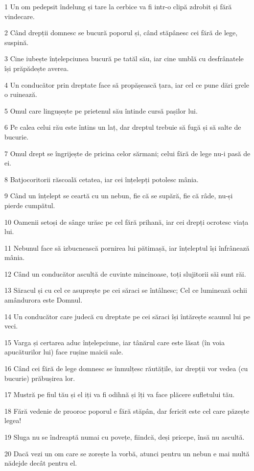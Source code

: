 \par 1 Un om pedepsit îndelung și tare la cerbice va fi intr-o clipă zdrobit și fără vindecare.
\par 2 Când drepții domnesc se bucură poporul și, când stăpânesc cei fără de lege, suspină.
\par 3 Cine iubește înțelepciunea bucură pe tatăl său, iar cine umblă cu desfrânatele își prăpădește averea.
\par 4 Un conducător prin dreptate face să propășească țara, iar cel ce pune dări grele o ruinează.
\par 5 Omul care lingușește pe prietenul său întinde cursă pașilor lui.
\par 6 Pe calea celui rău este întins un laț, dar dreptul trebuie să fugă și să salte de bucurie.
\par 7 Omul drept se îngrijește de pricina celor sărmani; celui fără de lege nu-i pasă de ei.
\par 8 Batjocoritorii răscoală cetatea, iar cei înțelepți potolesc mânia.
\par 9 Când un înțelept se ceartă cu un nebun, fie că se supără, fie că râde, nu-și pierde cumpătul.
\par 10 Oamenii setoși de sânge urăsc pe cel fără prihană, iar cei drepți ocrotesc viața lui.
\par 11 Nebunul face să izbucnească pornirea lui pătimașă, iar înțeleptul își înfrânează mânia.
\par 12 Când un conducător ascultă de cuvinte mincinoase, toți slujitorii săi sunt răi.
\par 13 Săracul și cu cel ce asuprește pe cei săraci se întâlnesc; Cel ce luminează ochii amândurora este Domnul.
\par 14 Un conducător care judecă cu dreptate pe cei săraci își întărește scaunul lui pe veci.
\par 15 Varga și certarea aduc înțelepciune, iar tânărul care este lăsat (în voia apucăturilor lui) face rușine maicii sale.
\par 16 Când cei fără de lege domnesc se înmulțesc răutățile, iar drepții vor vedea (cu bucurie) prăbușirea lor.
\par 17 Mustră pe fiul tău și el iți va fi odihnă și îți va face plăcere sufletului tău.
\par 18 Fără vedenie de prooroc poporul e fără stăpân, dar fericit este cel care păzește legea!
\par 19 Sluga nu se îndreaptă numai cu povețe, fiindcă, deși pricepe, însă nu ascultă.
\par 20 Dacă vezi un om care se zorește la vorbă, atunci pentru un nebun e mai multă nădejde decât pentru el.
